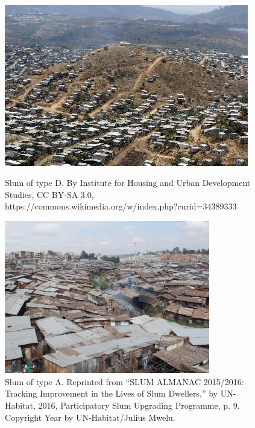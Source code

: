 \documentclass[10pt]{article}
\begin{document}
\begin{figure}[h]
    \centering
    \begin{minipage}{0.40\linewidth}
        \centering
        \includegraphics[width=0.95\textwidth]{images/slum_a.jpg}
        \caption{Slum of type D. By Institute for Housing and Urban Development Studies, CC BY-SA 3.0, https://commons.wikimedia.org/w/index.php?curid=34389333}
        \label{fig:slumD}
    \end{minipage}%
    \begin{minipage}{0.40\linewidth}
        \centering
        \includegraphics[width=0.8\textwidth]{images/slum1.png}
        \caption{Slum of type A. Reprinted from “SLUM ALMANAC 2015/2016: Tracking Improvement in the Lives of Slum Dwellers,” by  UN-Habitat, 2016, Participatory Slum Upgrading Programme, p. 9. Copyright Year by UN-Habitat/Julius Mwelu.}
        \label{fig:slumA}
    \end{minipage}
\end{figure}
\end{document}
